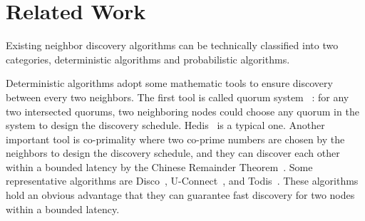 \section{Related Work}
\label{RW}








Existing neighbor discovery algorithms can be technically classified into two categories, deterministic algorithms and probabilistic algorithms.

Deterministic algorithms adopt some mathematic tools to ensure discovery between every two neighbors. The first tool is called quorum system~\cite{jiang2005quorum,luk1997two} : for any two intersected quorums, two neighboring nodes could choose any quorum in the system to design the discovery schedule. Hedis~\cite{chen2015heterogeneous} is a typical one. Another important tool is co-primality where two co-prime numbers are chosen by the neighbors to design the discovery schedule, and they can discover each other within a bounded latency by the Chinese Remainder Theorem~\cite{ding1996chinese}. Some representative algorithms are Disco~\cite{dutta2008practical}, U-Connect~\cite{kandhalu2010u}, and Todis~\cite{chen2015heterogeneous}. These algorithms hold an obvious advantage that they can guarantee fast discovery for two nodes within a bounded latency. 


